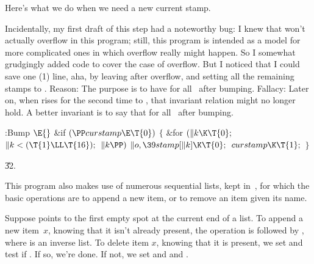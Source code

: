 Here's what we do when we need a new current stamp.

Incidentally, my first draft of this step had a noteworthy bug: I knew that
 won't actually overflow in this program; still, this program
is
intended as a model for more complicated ones in which overflow really
might happen. So I somewhat grudgingly added code to cover the case of
overflow. But I noticed that I could save one (1) line, aha, by
leaving  after overflow, and setting all the
remaining
stamps to . Reason: The purpose is to have  for
all~ after bumping. Fallacy: Later on, when  rises for
the second time to
, that invariant relation might no longer hold. A better
invariant
is to say that  for all~ after
bumping.

\Y\B\4:Bump \X${}\E{}$\6
\&{if} ${}(\PP\\{curstamp}\E\T{0}){}$\5
${}\{{}$\1\6
\&{for} ${}(\|k\K\T{0};{}$ ${}\|k<(\T{1}\LL\T{16});{}$ ${}\|k\PP){}$\1\5
${}\|o,\39\\{stamp}[\|k]\K\T{0};{}$\2\6
${}\\{curstamp}\K\T{1};{}$\6
\4${}\}{}$\2\par
\U32.\fi

This program also makes use of numerous sequential
lists, kept in~,
for which the basic operations are to append a new item, or to remove
an item given its name.

Suppose  points to the first empty spot at the current end of a list.
To append a new item~$x$, knowing that it isn't already present,
the operation is  followed by , where %
 is an
inverse list. To delete item $x$, knowing that it is present,
we set  and test if . If so, we're done.
If not,
we set  and  and .

